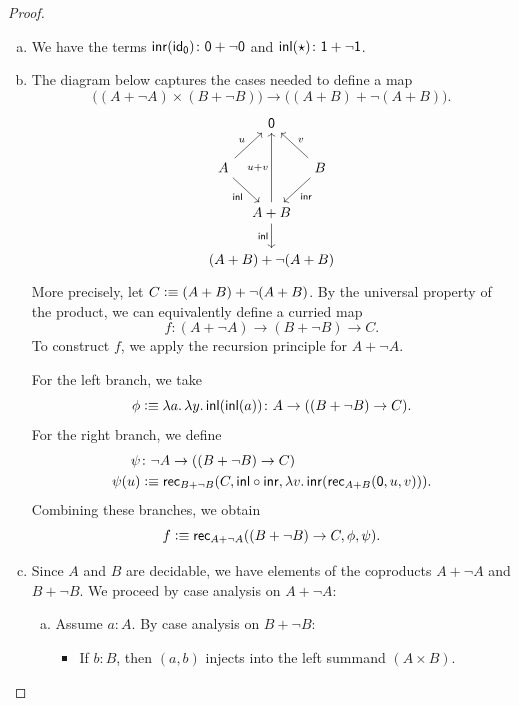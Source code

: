 \begin{proof}${}$
    \begin{enumerate}[a), font=\upshape]
        \item We have the terms $\fun{inr}(\id_{\fun0})\colon\fun0+\neg\fun0$ and $\fun{inl}(\fstar)\colon\fun1+\neg\fun1$.
        
        \item The diagram below captures the cases needed to define a map
        \[
            \bigl((A+\neg A)\times(B+\neg B)\bigr)
                \to\bigl((A+B)+\neg(A+B)\bigr).
        \]
        \[
            \begin{tikzcd}[column sep=-0.8cm]
                    &\fun0\\
                A
                        \arrow[rd,"\fun{inl}"']
                        \arrow[ru,"u"]
                    &&B
                        \arrow[ld,"\fun{inr}"]
                        \arrow[lu,"v"']\\
                    &A+B
                        \arrow[d,"\fun{inl}"']
                        \arrow[uu,"u+v"]\\
                    &(A+B)+\neg(A+B)
            \end{tikzcd}
        \]
        More precisely, let $C\mathrel{\vcentcolon}\equiv(A+B)+\neg(A+B)$. By the universal property of the product, we can equivalently define a curried map
        \[
            f\colon(A+\neg A)\to(B+\neg B)\to C.
        \]
        To construct $f$, we apply the recursion principle for $A+\neg A$. 
        
        For the left branch, we take
        \[
            \phi\defeq\lambda a.\,\lambda y.\,
                \fun{inl}(\fun{inl}(a))
                    \colon A\to((B+\neg B)\to C).
        \]
        For the right branch, we define
        \begin{align*}
            \psi&\colon\neg A\to((B+\neg B)\to C)\\
            \psi(u)&\defeq\fun{rec}_{B+\neg B}
                (
                    C,
                    \fun{inl}\circ\fun{inr},
                    \lambda v.\,\fun{inr}
                        (\fun{rec}_{A+B}(\fun0,u,v))
                ).
        \end{align*}
        Combining these branches, we obtain
        \[
            f\mathrel{\vcentcolon}\equiv\mathsf{rec}_{A+\neg A}((B+\neg B)\to C,\phi,\psi).
        \]
        
        \item Since $A$ and $B$ are decidable, we have elements of the coproducts $A+\neg A$ and $B+\neg B$. We proceed by case analysis on $A + \neg A$:
        \begin{enumerate}[a), font=\upshape]
            \item Assume $a\colon A$. By case analysis on $B+\neg B$:
            \begin{itemize}
                \item If $b\colon B$, then $(a,b)$ injects into the left summand $(A\times B)$.
                

\end{itemize}
\end{enumerate}
\end{enumerate}
\end{proof}
